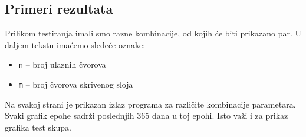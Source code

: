 \documentclass[a4paper]{article}
\begin{document}
\subsection{Primeri rezultata}
Prilikom testiranja imali smo razne kombinacije, od kojih će biti prikazano par. U daljem tekstu imaćemo sledeće oznake:
\begin{itemize}
    \item \texttt{n} -- broj ulaznih čvorova
    \item \texttt{m} -- broj čvorova skrivenog sloja
\end{itemize}
Na svakoj strani je prikazan izlaz programa za različite kombinacije parametara. Svaki grafik epohe sadrži poslednjih 365 dana u toj epohi. Isto važi i za prikaz grafika test skupa.

\pagebreak %
\end{document}
